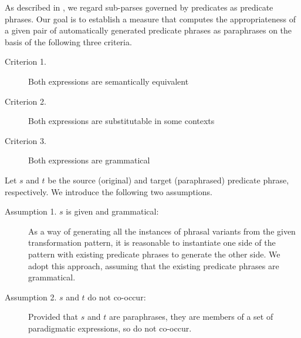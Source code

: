 \documentclass[english]{jnlp_1.4}
\begin{document}
As described in , we regard sub-parses governed by
predicates as predicate phrases.
Our goal is to establish a measure that computes the appropriateness
of a given pair of automatically generated predicate phrases as
paraphrases on the basis of the following three criteria.
\begin{description}
\item[Criterion 1.] Both expressions are semantically equivalent
\item[Criterion 2.] Both expressions are substitutable in some
  contexts
\item[Criterion 3.] Both expressions are grammatical
\end{description}

Let $s$ and $t$ be the source (original) and target (paraphrased)
predicate phrase, respectively.  We introduce the following two
assumptions.
\begin{description}
\item[Assumption 1. $s$ is given and grammatical:] As a way of
  generating all the instances of phrasal variants from the given
  transformation pattern, it is reasonable to instantiate one side of
  the pattern with existing predicate phrases to generate the other
  side.  We adopt this approach, assuming that the existing predicate
  phrases are grammatical.
\item[Assumption 2. $s$ and $t$ do not co-occur:]  Provided that $s$
  and $t$ are paraphrases, they are members of a set of paradigmatic
  expressions, so do not co-occur.
\end{description}
\end{document}
